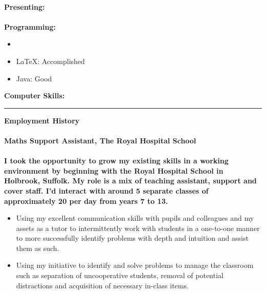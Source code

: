 \documentclass[10pt]{article}
\begin{document}
{\vspace{0cm}\\
\bfseries{Presenting: }\\
\vspace{0cm}\\
\bfseries{Programming: }
\begin{itemize}[itemsep=0mm, parsep=0pt]
\item {} 
\item LaTeX: Accomplished
\item Java: Good
\end{itemize}
\vspace{0cm}
\bfseries{Computer Skills: }\\
\rule[0.1cm]{\textwidth}{0.04cm}
\bfseries{Employment History}\\
\vspace{0.1cm}\\
 \hspace{77pt} \bfseries{Maths Support Assistant, The Royal Hospital School} \hspace{55pt} \\
\vspace{0cm}\\
I took the opportunity to grow my existing skills in a working environment by beginning with the Royal Hospital School in Holbrook, Suffolk. My role is a mix of teaching assistant, support and cover staff. I'd interact with around 5 separate classes of approximately 20 per day from years 7 to 13.
\begin{itemize}[itemsep=0mm, parsep=0pt]
\item Using my excellent communication skills with pupils and colleagues and my assets as a tutor to intermittently work with students in a one-to-one manner to more successfully identify problems with depth and intuition and assist them as such.
\item Using my initiative to identify and solve problems to manage the classroom such as separation of uncooperative students, removal of potential distractions and acquisition of necessary in-class items.

\end{itemize}}
\end{document}

